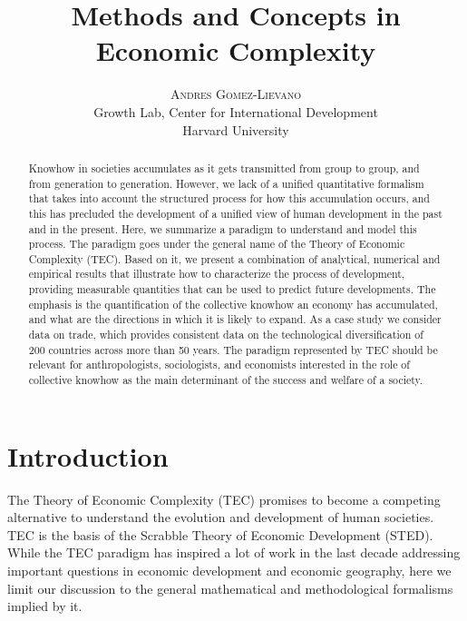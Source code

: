 \documentclass[12pt]{article}
\title{\vspace{-15mm}%
	\fontsize{24pt}{10pt}\selectfont
	\textbf{Methods and Concepts in Economic Complexity}
	}
\author{%
	\large
	\textsc{Andres Gomez-Lievano} \\[1.5mm]
	\normalsize	Growth Lab, Center for International Development \\
	\normalsize	Harvard University 
	\vspace{-5mm}
	}
\date{}
\begin{document}
\maketitle

\begin{abstract}
Knowhow in societies accumulates as it gets transmitted from group to group, and from generation to generation. 
However, we lack of a unified quantitative formalism that takes into account the structured process for how this accumulation occurs, and this has precluded the development of a unified view of human development in the past and in the present. 
Here, we summarize a paradigm to understand and model this process. 
The paradigm goes under the general name of the Theory of Economic Complexity (TEC). 
Based on it, we present a combination of analytical, numerical and empirical results that illustrate how to characterize the process of development, providing measurable quantities that can be used to predict future developments. 
The emphasis is the quantification of the collective knowhow an economy has accumulated, and what are the directions in which it is likely to expand. 
As a case study we consider data on trade, which provides consistent data on the technological diversification of 200 countries across more than 50 years. 
The paradigm represented by TEC should be relevant for anthropologists, sociologists, and economists interested in the role of collective knowhow as the main determinant of the success and welfare of a society. 
\end{abstract}

\newpage
\tableofcontents

\newpage

\section{Introduction}
The Theory of Economic Complexity (TEC) promises to become a competing alternative to understand the evolution and development of human societies. TEC is the basis of the Scrabble Theory of Economic Development (STED). While the TEC paradigm has inspired a lot of work in the last decade addressing important questions in economic development and economic geography, here we limit our discussion to the general mathematical and methodological formalisms implied by it.
\end{document}
